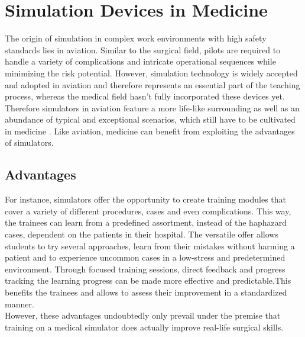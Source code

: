 \section{Simulation Devices in Medicine}

The origin of simulation in complex work environments with high safety standards lies in aviation. Similar to the surgical field, pilots are required to handle a variety of complications and intricate operational sequences while minimizing the risk potential. However, simulation technology is widely accepted and adopted in aviation and therefore represents an essential part of the teaching process, whereas the medical field hasn’t fully incorporated these devices yet\parencite{pandey_expanding_2012}. Therefore simulators in aviation feature a more life-like surrounding as well as an abundance of typical and exceptional scenarios, which still have to be cultivated in medicine \parencite{niels_taatgen_procedural_2013}. Like aviation, medicine can benefit from exploiting the advantages of simulators.

\subsection{Advantages}

For instance, simulators offer the opportunity to create training modules that cover a variety of different procedures, cases and even complications. This way, the trainees can learn from a predefined assortment, instead of the haphazard cases, dependent on the patients in their hospital. The versatile offer allows students to try several approaches, learn from their mistakes without harming a patient and to experience uncommon cases in a low-stress and predetermined environment. Through focused training sessions, direct feedback and progress tracking the learning progress can be made more effective and predictable.This benefits the trainees and allows to assess their improvement in a standardized manner\parencite{eason_simulation_2005}\parencite{lake_simulation_2005}. \\
However, these advantages undoubtedly only prevail under the premise that training on a medical simulator does actually improve real-life surgical skills. 
